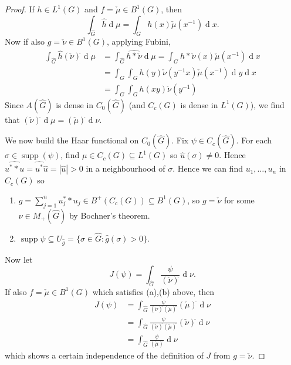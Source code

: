 \documentclass[11pt, a4paper]{memoir}
\theoremstyle{change}
\theoremstyle{plain}
\theoremstyle{nonumberplain}
\newtheorem{proof}{Proof}
\DeclareMathOperator{\supp}{supp}
\renewcommand{\d}[1]{\ensuremath{\operatorname{d}\!{#1}}}
\numberwithin{equation}{section}
\begin{document}
\begin{proof}
    If $h\in L^1(G)$ and $f=\check{\mu}\in B^1(G)$, then
    \begin{equation*}
        \int_{\widehat{G}}\hat{h}\d{\mu}=\int_G h(x)\check{\mu}(x^{-1})\d{x}.
    \end{equation*}
    Now if also $g=\check{\nu}\in B^1(G)$, applying Fubini,
    \begin{align*}
        \int_{\widehat{G}}\hat{h}(\check{\nu})^\hat{}\d{\mu} &= \int_{\widehat{G}}\widehat{h*\check{\nu}}\d{\mu}=\int_G h*\check{\nu}(x)\check{\mu}(x^{-1})\d{x}\\
                                                             &= \int_G\int_G h(y)\check{\nu}(y^{-1}x)\check{\mu}(x^{-1})\d{y}\d{x}\\
                                                             &= \int_G\int_G h(xy)\check{\nu}(y^{-1})
    \end{align*}
    Since $A(\widehat{G})$ is dense in $C_0(\widehat{G})$ (and $C_c(G)$ is dense in $L^1(G)$), we find that $(\check{\nu})^{\hat{}}\d{\mu}=(\check{\mu})^{\hat{}}\d{\nu}$.

    We now build the Haar functional on $C_0(\widehat{G})$.
    Fix $\psi\in C_c(\widehat{G})$.
    For each $\sigma\in\supp(\psi)$, find $\mu\in C_c(G)\subseteq L^1(G)$ so $\hat{u}(\sigma)\neq 0$.
    Hence $\widehat{u^**u}=\hat{u^*}\hat{u}=|\hat{u}|>0$ in a neighbourhood of $\sigma$.
    Hence we can find $u_1,\ldots,u_n$ in $C_c(G)$ so
    \begin{enumerate}[a]
        \item $g=\sum_{j=1}^nu_j^**u_j\in B^+(C_c(G))\subseteq B^1(G)$, so $g=\check{\nu}$ for some $\nu\in M_+(\widehat{G})$ by Bochner's theorem.
        \item $\supp\psi\subseteq U_{\hat{g}}=\{\sigma\in\widehat{G}:\hat{g}(\sigma)>0\}$.
    \end{enumerate}
    Now let
    \begin{equation*}
        J(\psi) = \int_{\widehat{G}}\frac{\psi}{(\check{\nu})^{\hat{}}}\d{\nu}.
    \end{equation*}
    If also $f=\check{\mu}\in B^1(G)$ which satisfies (a),(b) above, then
    \begin{align*}
        J(\psi)&= \int_{\widehat{G}}\frac{\psi}{(\check{\nu})^{\hat{}}(\check{\mu})^{\hat{}}}(\check{\mu})^{\hat{}}\d{\nu}\\
               &= \int_{\widehat{G}}\frac{\psi}{(\check{\nu})^{\hat{}}(\check{\mu})^{\hat{}}}(\check{\nu})^{\hat{}}\d{\nu}\\
               &= \int_{\widehat{G}}\frac{\psi}{(\check{\mu})^{\hat{}}}\d{\nu}
    \end{align*}
    which shows a certain independence of the definition of $J$ from $g=\check{\nu}$.


\end{proof}
\end{document}
